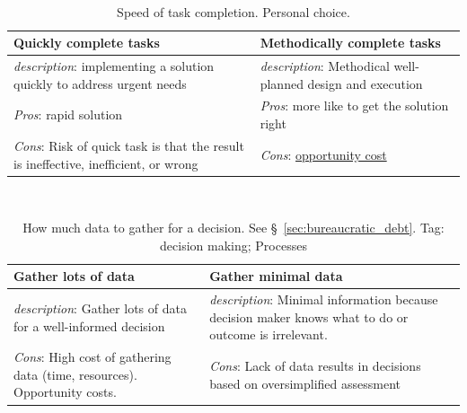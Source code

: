 \ \\

\begin{center}
\begin{table}[ht]
\begin{tabular}{ | m{\dilemmatablewidth}| m{\dilemmatablewidth} | } 
  \hline
  \textbf{Quickly complete tasks} & \textbf{Methodically complete tasks} \\ 
  \hline
  \textit{description}: implementing a solution quickly to address urgent needs &
  \textit{description}: Methodical well-planned design and execution \\
  \hline
  \textit{Pros}: rapid solution &
  \textit{Pros}: more like to get the solution right \\
  \hline
  \textit{Cons}: Risk of quick task is that the result is ineffective, inefficient, or wrong &
  \textit{Cons}: \href{https://en.wikipedia.org/wiki/Opportunity_cost}{opportunity cost} \\  
  \hline
\end{tabular}
\caption{Speed of task completion.
{\tiny Personal choice.}
}
\end{table}
\end{center}

\ \\

\begin{center}
\begin{table}[ht]
\begin{tabular}{ | m{\dilemmatablewidth}| m{\dilemmatablewidth} | } 
  \hline
  \textbf{Gather lots of data} &
  \textbf{Gather minimal data} \\
  \hline
  \textit{description}: Gather lots of data for a well-informed decision &
  \textit{description}: Minimal information because decision maker knows what to do or outcome is irrelevant.  \\  
  \hline
  \textit{Cons}: High cost of gathering data (time, resources). Opportunity costs. & 
  \textit{Cons}: Lack of data results in decisions based on oversimplified assessment \\
  \hline
\end{tabular}
\caption{How much data to gather for a decision. See \S~\ref{sec:bureaucratic_debt}.
{\tiny Tag: decision making; Processes}
}
\label{table:gather_data_lots-vs-little}
\end{table}
\end{center}

